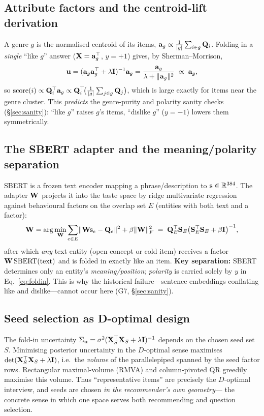 \subsection{Attribute factors and the centroid-lift derivation}\label{sec:attr}
A genre $g$ is the normalised centroid of its items, $\mathbf a_g \propto \tfrac1{|g|}\sum_{i\in g}\mathbf{Q}_i$. Folding
in a \emph{single} ``like $g$'' answer ($\mathbf{X}=\mathbf a_g^\top$, $y=+1$) gives, by Sherman--Morrison,
\begin{equation}
  \mathbf{u}=(\mathbf a_g\mathbf a_g^\top+\lambda\mathbf{I})^{-1}\mathbf a_g
     =\frac{\mathbf a_g}{\lambda+\lVert\mathbf a_g\rVert^2}\;\propto\;\mathbf a_g,
\end{equation}
so $\mathrm{score}(i)\propto \mathbf{Q}_i^\top\mathbf a_g \propto \mathbf{Q}_i^\top\!\bigl(\tfrac1{|g|}\sum_{j\in g}\mathbf{Q}_j\bigr)$,
which is large exactly for items near the genre cluster. This \emph{predicts} the genre-purity and polarity sanity
checks (\S\ref{sec:sanity}): ``like $g$'' raises $g$'s items, ``dislike $g$'' ($y={-}1$) lowers them
symmetrically.

\subsection{The SBERT adapter and the meaning/polarity separation}\label{sec:sbert}
SBERT is a frozen text encoder mapping a phrase/description to $\mathbf s\in\mathbb{R}^{384}$. The adapter $\mathbf{W}$ projects it
into the taste space by ridge multivariate regression against behavioural factors on the overlap set $E$ (entities
with both text and a factor):
\begin{equation}
  \mathbf{W}=\arg\min_{\mathbf{W}}\sum_{e\in E}\lVert\mathbf{W}\mathbf s_e-\mathbf{Q}_e\rVert^2+\beta\lVert\mathbf{W}\rVert_F^2
   \;=\;\mathbf{Q}_E^\top \mathbf S_E\bigl(\mathbf S_E^\top\mathbf S_E+\beta\mathbf{I}\bigr)^{-1},
\end{equation}
after which \emph{any} text entity (open concept or cold item) receives a factor $\mathbf{W}\,\mathrm{SBERT}(\text{text})$
and is folded in exactly like an item. \textbf{Key separation:} SBERT determines only an entity's
\emph{meaning/position}; \emph{polarity} is carried solely by $y$ in Eq.~\eqref{eq:foldin}. This is why the
historical failure---sentence embeddings conflating like and dislike---cannot occur here (G7, \S\ref{sec:sanity}).

\subsection{Seed selection as D-optimal design}\label{sec:rmva}
The fold-in uncertainty $\Sigma_{\mathbf{u}}=\sigma^2(\mathbf{X}_S^\top\mathbf{X}_S+\lambda\mathbf{I})^{-1}$ depends on the chosen seed set $S$.
Minimising posterior uncertainty in the $D$-optimal sense maximises
$\det(\mathbf{X}_S^\top\mathbf{X}_S+\lambda\mathbf{I})$, i.e.\ the \emph{volume} of the parallelepiped spanned by the seed factor rows.
Rectangular maximal-volume (RMVA) and column-pivoted QR greedily maximise this volume. Thus ``representative
items'' are precisely the $D$-optimal interview, and seeds are chosen \emph{in the recommender's own geometry}---
the concrete sense in which one space serves both recommending and question selection.


